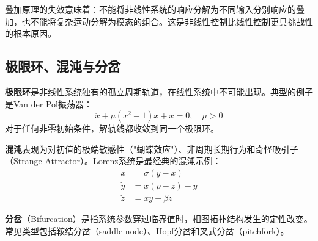\begin{remark}
叠加原理的失效意味着：不能将非线性系统的响应分解为不同输入分别响应的叠加，也不能将复杂运动分解为模态的组合。这是非线性控制比线性控制更具挑战性的根本原因。
\end{remark}

\subsection{极限环、混沌与分岔}

\textbf{极限环}是非线性系统独有的孤立周期轨道，在线性系统中不可能出现。典型的例子是Van der Pol振荡器：
\[
\ddot{x} + \mu(x^2 - 1)\dot{x} + x = 0,\quad \mu > 0
\]
对于任何非零初始条件，解轨线都收敛到同一个极限环。

\textbf{混沌}表现为对初值的极端敏感性（"蝴蝶效应"）、非周期长期行为和奇怪吸引子（Strange Attractor）。Lorenz系统是最经典的混沌示例：
\begin{align*}
\dot{x} &= \sigma(y - x) \\
\dot{y} &= x(\rho - z) - y \\
\dot{z} &= xy - \beta z
\end{align*}

\textbf{分岔}（Bifurcation）是指系统参数穿过临界值时，相图拓扑结构发生的定性改变。常见类型包括鞍结分岔（saddle-node）、Hopf分岔和叉式分岔（pitchfork）。

